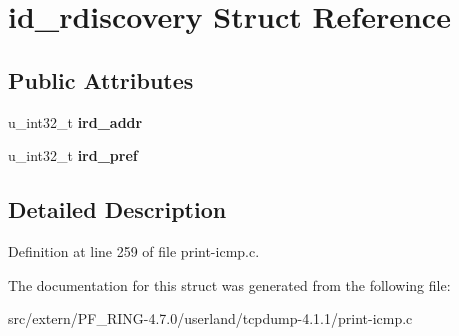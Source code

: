 \hypertarget{structid__rdiscovery}{
\section{id\_\-rdiscovery Struct Reference}
\label{structid__rdiscovery}
}
\subsection*{Public Attributes}
\begin{DoxyCompactItemize}
\item 
\hypertarget{structid__rdiscovery_a03d5539511ed13123f6f68214af4f98a}{
u\_\-int32\_\-t {\bfseries ird\_\-addr}}
\label{structid__rdiscovery_a03d5539511ed13123f6f68214af4f98a}

\item 
\hypertarget{structid__rdiscovery_ac6c18548c73b63d93aac7f1d0b4b1b42}{
u\_\-int32\_\-t {\bfseries ird\_\-pref}}
\label{structid__rdiscovery_ac6c18548c73b63d93aac7f1d0b4b1b42}

\end{DoxyCompactItemize}


\subsection{Detailed Description}


Definition at line 259 of file print-\/icmp.c.



The documentation for this struct was generated from the following file:\begin{DoxyCompactItemize}
\item 
src/extern/PF\_\-RING-\/4.7.0/userland/tcpdump-\/4.1.1/print-\/icmp.c\end{DoxyCompactItemize}
